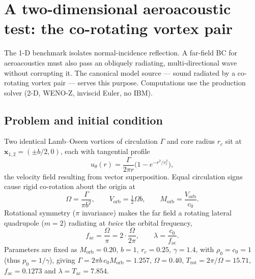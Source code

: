 \documentclass{jfm}
\newcommand{\xv}{\bm{x}}
\begin{document}
\section{A two-dimensional aeroacoustic test: the co-rotating vortex
pair}\label{sec:cvp}

The 1-D benchmark isolates normal-incidence reflection. A far-field BC for
aeroacoustics must also pass an obliquely radiating, multi-directional wave without
corrupting it. The canonical model source --- sound radiated by a co-rotating vortex
pair \citep{mitchell1995} --- serves this purpose. Computations use the production
solver (2-D, WENO-Z, inviscid Euler, no IBM).

\subsection{Problem and initial condition}

Two identical Lamb--Oseen vortices of circulation $\Gamma$ and core radius $r_c$
sit at $\xv_{1,2}=(\pm b/2,0)$, each with tangential profile
\begin{equation}
u_\theta(r)=\frac{\Gamma}{2\pi r}\Big(1-e^{-r^2/r_c^2}\Big),
\end{equation}
the velocity field resulting from vector superposition. Equal circulation signs cause
rigid co-rotation about the origin at
\begin{equation}
\Omega=\frac{\Gamma}{\pi b^2},\qquad
V_{\mathrm{orb}}=\tfrac12\Omega b,\qquad
M_{\mathrm{orb}}=\frac{V_{\mathrm{orb}}}{c_0}.
\end{equation}
Rotational symmetry ($\pi$ invariance) makes the far field a rotating lateral quadrupole
($m=2$) radiating at \emph{twice} the orbital frequency,
\begin{equation}
f_{\mathrm{ac}}=\frac{\Omega}{\pi}=2\cdot\frac{\Omega}{2\pi},\qquad
\lambda=\frac{c_0}{f_{\mathrm{ac}}}.
\end{equation}
Parameters are fixed as $M_{\mathrm{orb}}=0.20$, $b=1$, $r_c=0.25$, $\gamma=1.4$, with
$\rho_0=c_0=1$ (thus $p_0=1/\gamma$), giving $\Gamma=2\pi b\,c_0M_{\mathrm{orb}}=1.257$,
$\Omega=0.40$, $T_{\mathrm{rot}}=2\pi/\Omega=15.71$, $f_{\mathrm{ac}}=0.1273$ and
$\lambda=T_{\mathrm{ac}}=7.854$.
\end{document}
